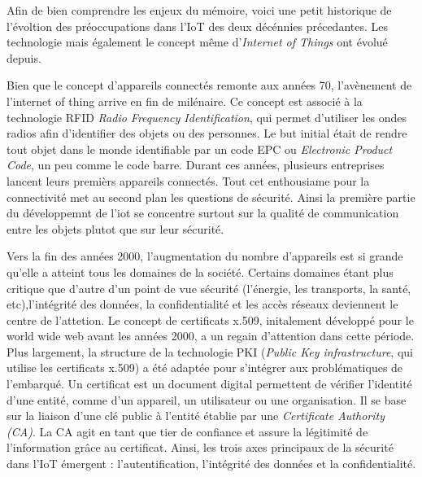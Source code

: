 \vspace{0.1cm}

Afin de bien comprendre les enjeux du mémoire, voici une petit historique de l'évoltion des préoccupations dans l'IoT des deux décénnies précedantes. Les technologie mais également le concept même d'\textit{Internet of Things} ont évolué depuis.

\vspace{0.1cm}

Bien que le concept d'appareils connectés remonte aux années 70, l'avènement de l'internet of thing arrive en fin de milénaire. Ce concept est associé à la technologie RFID \textit{Radio Frequency Identification}\cite{RFID}, qui permet d'utiliser les ondes radios afin d'identifier des objets ou des personnes. Le but initial était de rendre tout objet dans le monde identifiable par un code EPC ou \textit{Electronic Product Code}\cite{EPC}, un peu comme le code barre. Durant ces années, plusieurs entreprises lancent leurs premièrs appareils connectés. Tout cet enthousiame pour la connectivité met au second plan les questions de sécurité. Ainsi la première partie du développemnt de l'iot se concentre surtout sur la qualité de communication entre les objets plutot que sur leur sécurité.

\vspace{0.1cm}

Vers la fin des années 2000, l'augmentation du nombre d'appareils est si grande qu'elle a atteint tous les domaines de la société. Certains domaines étant plus critique que d'autre d'un point de vue sécurité (l'énergie, les transports, la santé, etc),l'intégrité des données, la confidentialité et les accès réseaux deviennent le centre de l'attetion. 
Le concept de certificats x.509, initalement développé pour le world wide web avant les années 2000, a un regain d'attention dans cette période. Plus largement, la structure de la technologie PKI (\textit{Public Key infrastructure}, qui utilise les certificats x.509)\cite{PKI} a été adaptée pour s'intégrer aux problématiques de l'embarqué. Un certificat est un document digital permettent de vérifier l'identité d'une entité, comme d'un appareil, un utilisateur ou une organisation. Il se base sur la liaison d'une clé public à l'entité établie par une \textit{Certificate Authority (CA)}. La CA agit en tant que tier de confiance et assure la légitimité de l'information grâce au certificat. Ainsi, les trois axes principaux de la sécurité dans l'IoT émergent : l'autentification, l'intégrité des données et la confidentialité.

